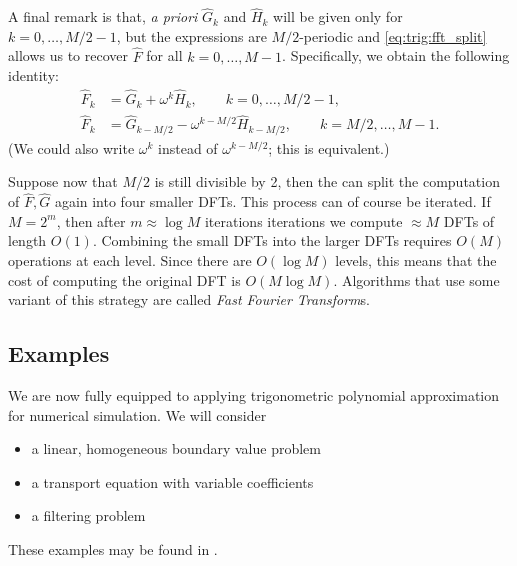 A final remark is that, {\it a priori} $\hat{G}_k$ and $\hat{H}_k$ will be given
only for $k = 0, \dots, M/2-1$, but the expressions are $M/2$-periodic and
\eqref{eq:trig:fft_split} allows us to recover $\hat{F}$ for all $k = 0, \dots,
M-1$. Specifically, we obtain the following identity:
%
\begin{equation} \label{eq:trig:fft_trick}
  \begin{split}
    \hat{F}_k &= \hat{G}_k + \omega^k \hat{H}_k, \qquad k = 0, \dots, M/2-1, \\
    \hat{F}_k &= \hat{G}_{k-M/2} - \omega^{k-M/2} \hat{H}_{k-M/2},
      \qquad k = M/2, \dots, M-1.
  \end{split}
\end{equation}
(We could also write $\omega^k$ instead of $\omega^{k-M/2}$; this is
equivalent.)

Suppose now that $M/2$ is still divisible by 2, then the can split the
computation of $\hat{F}, \hat{G}$ again into four smaller DFTs. This process can
of course be iterated. If $M = 2^m$, then after $m \approx \log M$ iterations
iterations we compute $\approx M$ DFTs of length $O(1)$. Combining the small
DFTs into the larger DFTs requires $O(M)$ operations at each level. Since there
are $O(\log M)$ levels, this means that the cost of computing the original DFT
is $O(M \log M)$. Algorithms that use some variant of this strategy are called
{\em Fast Fourier Transform}s.



\subsection{Examples}
%
We are now fully equipped to applying trigonometric polynomial approximation for
numerical simulation. We will consider
\begin{itemize}
  \item a linear, homogeneous boundary value problem
  \item a transport equation with variable coefficients
  \item a filtering problem
\end{itemize}
These examples may be found in \nbtrig.




